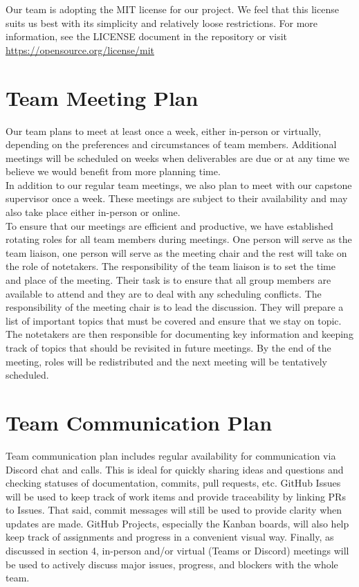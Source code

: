 \documentclass{article}
\begin{document}
Our team is adopting the MIT license for our project. We feel that this license suits us best with its simplicity and relatively loose restrictions. For more information, see the LICENSE document in the repository or visit \url{https://opensource.org/license/mit}

\section{Team Meeting Plan}

Our team plans to meet at least once a week, either in-person or virtually, depending on the preferences and circumstances of team members. Additional meetings will be scheduled on weeks when deliverables are due or at any time we believe we would benefit from more planning time.\\

In addition to our regular team meetings, we also plan to meet with our capstone supervisor once a week. These meetings are subject to their availability and may also take place either in-person or online.\\

To ensure that our meetings are efficient and productive, we have established rotating roles for all team members during meetings. One person will serve as the team liaison, one person will serve as the meeting chair and the rest will take on the role of notetakers. The responsibility of the team liaison is to set the time and place of the meeting. Their task is to ensure that all group members are available to attend and they are to deal with any scheduling conflicts. The responsibility of the meeting chair is to lead the discussion. They will prepare a list of important topics that must be covered and ensure that we stay on topic. The notetakers are then responsible for documenting key information and keeping track of topics that should be revisited in future meetings. By the end of the meeting, roles will be redistributed and the next meeting will be tentatively scheduled.

\section{Team Communication Plan}

Team communication plan includes regular availability for communication via Discord chat and calls. This is ideal for quickly sharing ideas and questions and checking statuses of documentation, commits, pull requests, etc. GitHub Issues will be used to keep track of work items and provide traceability by linking PRs to Issues. That said, commit messages will still be used to provide clarity when updates are made. GitHub Projects, especially the Kanban boards, will also help keep track of assignments and progress in a convenient visual way. Finally, as discussed in section 4, in-person and/or virtual (Teams or Discord) meetings will be used to actively discuss major issues, progress, and blockers with the whole team.
\end{document}
